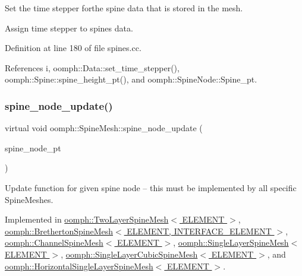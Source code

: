 Set the time stepper forthe spine data that is stored in the mesh. 

Assign time stepper to spines data. 

Definition at line 180 of file spines.\+cc.



References i, oomph\+::\+Data\+::set\+\_\+time\+\_\+stepper(), oomph\+::\+Spine\+::spine\+\_\+height\+\_\+pt(), and oomph\+::\+Spine\+Node\+::\+Spine\+\_\+pt.

\mbox{\label{classoomph_1_1SpineMesh_aa7843aadce3c540f34442671f59eb75b}} 
\subsubsection{\texorpdfstring{spine\+\_\+node\+\_\+update()}{spine\_node\_update()}}
{\footnotesize\ttfamily virtual void oomph\+::\+Spine\+Mesh\+::spine\+\_\+node\+\_\+update (\begin{DoxyParamCaption}\item[{\hyperlink{classoomph_1_1SpineNode}{Spine\+Node} $\ast$}]{spine\+\_\+node\+\_\+pt }\end{DoxyParamCaption})\hspace{0.3cm}{\ttfamily [pure virtual]}}



Update function for given spine node -- this must be implemented by all specific Spine\+Meshes. 



Implemented in \hyperlink{classoomph_1_1TwoLayerSpineMesh_ad9b80ae7e34be72ca03f6d1bc6062de4}{oomph\+::\+Two\+Layer\+Spine\+Mesh$<$ E\+L\+E\+M\+E\+N\+T $>$}, \hyperlink{classoomph_1_1BrethertonSpineMesh_a981301706d4940cfb24d3d769a7a523b}{oomph\+::\+Bretherton\+Spine\+Mesh$<$ E\+L\+E\+M\+E\+N\+T, I\+N\+T\+E\+R\+F\+A\+C\+E\+\_\+\+E\+L\+E\+M\+E\+N\+T $>$}, \hyperlink{classoomph_1_1ChannelSpineMesh_aefa38017e44e64ad0cd86d87d397bf8d}{oomph\+::\+Channel\+Spine\+Mesh$<$ E\+L\+E\+M\+E\+N\+T $>$}, \hyperlink{classoomph_1_1SingleLayerSpineMesh_a364648c15ab29c0c8d1cf7c2bc4cb792}{oomph\+::\+Single\+Layer\+Spine\+Mesh$<$ E\+L\+E\+M\+E\+N\+T $>$}, \hyperlink{classoomph_1_1SingleLayerCubicSpineMesh_a4851fbaed5be21441ad4f7b7f2a660e0}{oomph\+::\+Single\+Layer\+Cubic\+Spine\+Mesh$<$ E\+L\+E\+M\+E\+N\+T $>$}, and \hyperlink{classoomph_1_1HorizontalSingleLayerSpineMesh_a4b9b833a281aa64a809b4e47159282e6}{oomph\+::\+Horizontal\+Single\+Layer\+Spine\+Mesh$<$ E\+L\+E\+M\+E\+N\+T $>$}.



